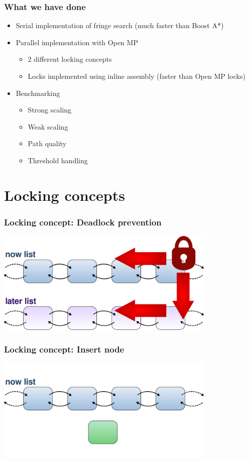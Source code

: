 \documentclass{beamer}
\begin{document}
\begin{frame}
\frametitle{What we have done}
\begin{itemize}
\item Serial implementation of fringe search (much faster than Boost A*)
\item Parallel implementation with Open MP
	\begin{itemize}
	\item 2 different locking concepts
	\item Locks implemented using inline assembly (faster than Open MP locks)
	\end{itemize}
\item Benchmarking
	\begin{itemize}
	\item Strong scaling
	\item Weak scaling
	\item Path quality
	\item Threshold handling
	\end{itemize}
\end{itemize}
\end{frame}

\section{Locking concepts}

\begin{frame}
\frametitle{Locking concept: Deadlock prevention}
\begin{center}
	\includegraphics[height=140pt]{locking.pdf}
\end{center}
\end{frame}

\begin{frame}
\frametitle{Locking concept: Insert node}
\begin{center}
	\includegraphics[height=140pt]{insert1.pdf}
\end{center}
\end{frame}
\end{document}
